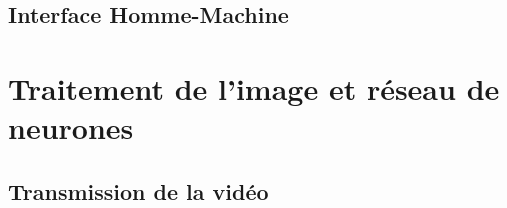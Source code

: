 			
			
		\subsection{Interface Homme-Machine}
		\label{sub:ihm}


	\section{Traitement de l'image et réseau de neurones}
	
		\subsection{Transmission de la vidéo}
		
